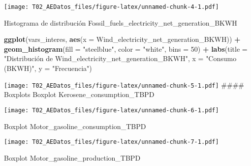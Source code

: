 \documentclass[
]{article}
\newenvironment{Shaded}{\begin{snugshade}}{\end{snugshade}}
\newcommand{\AttributeTok}[1]{\textcolor[rgb]{0.13,0.29,0.53}{#1}}
\newcommand{\DecValTok}[1]{\textcolor[rgb]{0.00,0.00,0.81}{#1}}
\newcommand{\FunctionTok}[1]{\textcolor[rgb]{0.13,0.29,0.53}{\textbf{#1}}}
\newcommand{\NormalTok}[1]{#1}
\newcommand{\SpecialCharTok}[1]{\textcolor[rgb]{0.81,0.36,0.00}{\textbf{#1}}}
\newcommand{\StringTok}[1]{\textcolor[rgb]{0.31,0.60,0.02}{#1}}
\begin{document}
\texttt{[image: T02\_AEDatos\_files/figure-latex/unnamed-chunk-4-1.pdf]}

Histograma de distribución
Fossil\_fuels\_electricity\_net\_generation\_BKWH

\begin{Shaded}
\begin{Highlighting}[]
\FunctionTok{ggplot}\NormalTok{(vars\_interes, }\FunctionTok{aes}\NormalTok{(}\AttributeTok{x =}\NormalTok{ Wind\_electricity\_net\_generation\_BKWH)) }\SpecialCharTok{+}
  \FunctionTok{geom\_histogram}\NormalTok{(}\AttributeTok{fill =} \StringTok{"steelblue"}\NormalTok{, }\AttributeTok{color =} \StringTok{"white"}\NormalTok{, }\AttributeTok{bins =} \DecValTok{50}\NormalTok{) }\SpecialCharTok{+}
  \FunctionTok{labs}\NormalTok{(}\AttributeTok{title =} \StringTok{"Distribución de Wind\_electricity\_net\_generation\_BKWH"}\NormalTok{,}
       \AttributeTok{x =} \StringTok{"Consumo (BKWH)"}\NormalTok{,}
       \AttributeTok{y =} \StringTok{"Frecuencia"}\NormalTok{)}
\end{Highlighting}
\end{Shaded}

\texttt{[image: T02\_AEDatos\_files/figure-latex/unnamed-chunk-5-1.pdf]}
\#\#\#\# Boxplots Boxplot Kerosene\_consumption\_TBPD

\begin{Shaded}
\end{Shaded}

\texttt{[image: T02\_AEDatos\_files/figure-latex/unnamed-chunk-6-1.pdf]}

Boxplot Motor\_gasoline\_consumption\_TBPD

\begin{Shaded}
\end{Shaded}

\texttt{[image: T02\_AEDatos\_files/figure-latex/unnamed-chunk-7-1.pdf]}

Boxplot Motor\_gasoline\_production\_TBPD

\begin{Shaded}
\end{Shaded}
\end{document}
